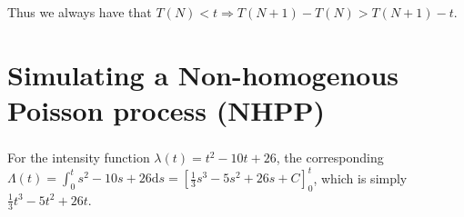 \documentclass[11pt, oneside]{article}   	%
\begin{document}
Thus we always have that $T(N) < t \Rightarrow T(N + 1) - T(N) > T(N + 1) - t$.
\section{}

\part{Simulating a Non-homogenous Poisson process (NHPP)}
\section{}
For the intensity function $\lambda(t) = t^2 - 10 t + 26$, the corresponding $\Lambda(t) = \int_{0}^{t} s^2 - 10 s + 26 \mathrm{d}s = \left[ \frac{1}{3}s^3 - 5 s^2 + 26 s + C \right]_{0}^{t}$, which is simply $\frac{1}{3}t^3 - 5 t^2 + 26 t $.
\end{document}
